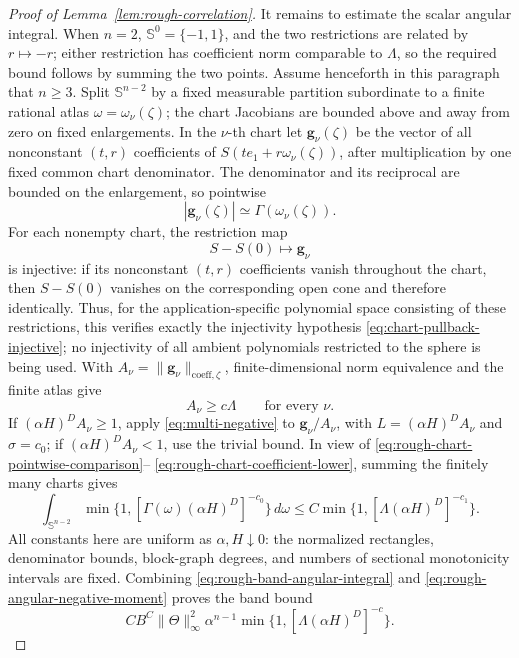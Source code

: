 \documentclass[11pt]{article}
\numberwithin{equation}{section}
\theoremstyle{remark}
\theoremstyle{definition}
\newcommand{\Sph}{\mathbb S}
\newcommand{\norm}[1]{\lVert #1\rVert}
\begin{document}
\begin{proof}[Proof of Lemma~\ref{lem:rough-correlation}]
It remains to estimate the scalar angular integral.  When $n=2$,
$\Sph^0=\{-1,1\}$, and the two restrictions are related by
$r\mapsto-r$; either restriction has coefficient norm comparable to
$\Lambda$, so the required bound follows by summing the two points.
Assume henceforth in this paragraph that $n\ge3$.  Split $\Sph^{n-2}$ by a
fixed measurable partition subordinate to a finite rational atlas
$\omega=\omega_\nu(\zeta)$; the chart Jacobians are bounded above and away
from zero on fixed enlargements.  In the $\nu$-th chart let
$\mathbf g_\nu(\zeta)$ be the vector of all nonconstant $(t,r)$
coefficients of $S(te_1+r\omega_\nu(\zeta))$, after multiplication by one
fixed common chart denominator.  The denominator and its reciprocal are
bounded on the enlargement, so pointwise
\begin{equation}\label{eq:rough-chart-pointwise-comparison}
 |\mathbf g_\nu(\zeta)|\simeq
 \Gamma(\omega_\nu(\zeta)).
\end{equation}
For each nonempty chart, the restriction map
\[
 S-S(0)\longmapsto\mathbf g_\nu
\]
is injective: if its nonconstant $(t,r)$ coefficients vanish throughout
the chart, then $S-S(0)$ vanishes on the corresponding open cone and
therefore identically.  Thus, for the application-specific polynomial
space consisting of these restrictions, this verifies exactly the
injectivity hypothesis \eqref{eq:chart-pullback-injective}; no injectivity
of all ambient polynomials restricted to the sphere is being used.  With
$A_\nu=\norm{\mathbf g_\nu}_{\mathrm{coeff},\zeta}$,
finite-dimensional norm equivalence and the finite atlas give
\begin{equation}\label{eq:rough-chart-coefficient-lower}
 A_\nu\ge c\Lambda
 \qquad\text{for every }\nu.
\end{equation}
If $(\alpha H)^DA_\nu\ge1$, apply
\eqref{eq:multi-negative} to $\mathbf g_\nu/A_\nu$, with
$L=(\alpha H)^DA_\nu$ and $\sigma=c_0$; if
$(\alpha H)^DA_\nu<1$, use the trivial bound.  In view of
\eqref{eq:rough-chart-pointwise-comparison}--
\eqref{eq:rough-chart-coefficient-lower}, summing the finitely many charts
gives
\begin{equation}\label{eq:rough-angular-negative-moment}
 \int_{\Sph^{n-2}}
 \min\{1,[\Gamma(\omega)(\alpha H)^D]^{-c_0}\}\,d\omega
 \le C\min\{1,[\Lambda(\alpha H)^D]^{-c_1}\}.
\end{equation}
All constants here are uniform as $\alpha,H\downarrow0$: the normalized
rectangles, denominator bounds, block-graph degrees, and numbers of
sectional monotonicity intervals are fixed.  Combining
\eqref{eq:rough-band-angular-integral} and
\eqref{eq:rough-angular-negative-moment} proves the band bound
\[
 CB^C\norm\Theta_\infty^2\alpha^{n-1}
 \min\{1,[\Lambda(\alpha H)^D]^{-c}\}.
\]


\end{proof}
\end{document}
